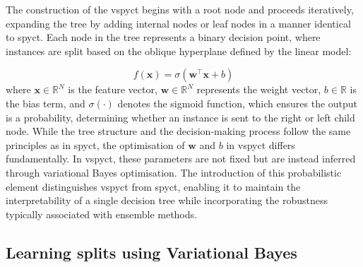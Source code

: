 \documentclass[3p,review,authoryear]{elsarticle}
\begin{document}
The construction of the \gls{vspyct} begins with a root node and proceeds iteratively, expanding the tree by adding internal nodes or leaf nodes in a manner identical to \gls{spyct}. Each node in the tree represents a binary decision point, where instances are split based on the oblique hyperplane defined by the linear model:

\begin{equation}
f(\mathbf{x}) = \sigma \left(\mathbf{w}^\top \mathbf{x} + b \right)
\label{eq:linear_model}
\end{equation}
where \(\mathbf{x} \in \mathbb{R}^N\) is the feature vector, \(\mathbf{w} \in \mathbb{R}^N\) represents the weight vector, \(b \in \mathbb{R}\) is the bias term, and \(\sigma(\cdot)\) denotes the sigmoid function, which ensures the output is a probability, determining whether an instance is sent to the right or left child node.
While the tree structure and the decision-making process follow the same principles as in \gls{spyct}, the optimisation of \(\mathbf{w}\) and \(b\) in \gls{vspyct} differs fundamentally.
In \gls{vspyct}, these parameters are not fixed but are instead inferred through variational Bayes optimisation.
The introduction of this probabilistic element distinguishes \gls{vspyct} from \gls{spyct}, enabling it to maintain the interpretability of a single decision tree while incorporating the robustness typically associated with ensemble methods.

\subsection{Learning splits using Variational Bayes}

\end{document}
